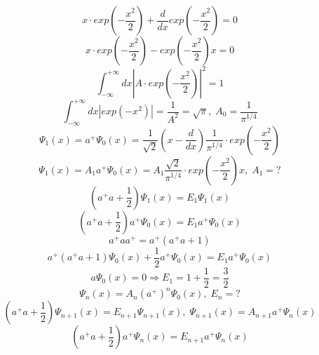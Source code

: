 \documentclass[1 pt]{article}
\begin{document}
\begin{equation*}
    x \cdot exp(-\frac{x^2}{2})+\frac{d}{dx} exp(-\frac{x^2}{2}) = 0
\end{equation*}
\begin{equation*}
    x \cdot exp(-\frac{x^2}{2})-exp(-\frac{x^2}{2})x = 0
\end{equation*}
\begin{equation*}
    \int_{- \infty}^{+ \infty} dx |A \cdot exp(-\frac{x^2}{2})|^2 = 1
\end{equation*}
\begin{equation}
    \int_{- \infty}^{+ \infty} dx |exp(-x^2)| = \frac{1}{A^2} = \sqrt{\pi}, \; A_0=\frac{1}{\pi^{1/4}}
\end{equation}
\begin{equation*}
    \Psi_1(x) = a^+ \Psi_0(x) = \frac{1}{\sqrt{2}}(x-\frac{d}{dx}) \frac{1}{\pi^{1/4}} \cdot exp(-\frac{x^2}{2})
\end{equation*}
\begin{equation}
    \Psi_1(x) = A_1 a^+ \Psi_0(x) = A_1 \frac{\sqrt{2}}{\pi^{1/4}} \cdot exp(-\frac{x^2}{2}) x, \; A_1 = ?
\end{equation}
\begin{equation*}
    (a^+a+\frac{1}{2}) \Psi_1(x) = E_1 \Psi_1 (x)
\end{equation*}
\begin{equation*}
    (a^+a+\frac{1}{2}) a^+ \Psi_0(x) = E_1 a^+ \Psi_0(x)
\end{equation*}
\begin{equation*}
    a^+a a^+ = a^+ (a^+ a + 1)
\end{equation*}
\begin{equation*}
    a^+ (a^+ a + 1) \Psi_0(x)+\frac{1}{2} a^+ \Psi_0(x) = E_1 a^+ \Psi_0(x)
\end{equation*}
\begin{equation}
    a \Psi_0(x) = 0 \Rightarrow E_1 = 1+ \frac{1}{2} = \frac{3}{2}
\end{equation}
\begin{equation}
    \Psi_n(x) = A_n (a^+)^n \Psi_0(x), \; E_n = ?
\end{equation}
\begin{equation*}
    (a^+a+\frac{1}{2}) \Psi_{n+1}(x) = E_{n+1} \Psi_{n+1} (x), \; \Psi_{n+1}(x) = A_{n+1} a^+ \Psi_n (x)
\end{equation*}
\begin{equation*}
    (a^+a+\frac{1}{2}) a^+ \Psi_n (x) = E_{n+1} a^+ \Psi_n (x)
\end{equation*}
\end{document}
